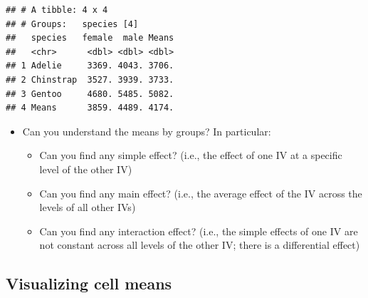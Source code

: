 \documentclass[
]{book}
\newenvironment{Shaded}{\begin{snugshade}}{\end{snugshade}}
\newcommand{\CommentTok}[1]{\textcolor[rgb]{0.56,0.35,0.01}{\textit{#1}}}
\newcommand{\DecValTok}[1]{\textcolor[rgb]{0.00,0.00,0.81}{#1}}
\newcommand{\FunctionTok}[1]{\textcolor[rgb]{0.13,0.29,0.53}{\textbf{#1}}}
\newcommand{\NormalTok}[1]{#1}
\newcommand{\OtherTok}[1]{\textcolor[rgb]{0.56,0.35,0.01}{#1}}
\newcommand{\SpecialCharTok}[1]{\textcolor[rgb]{0.81,0.36,0.00}{\textbf{#1}}}
\newcommand{\StringTok}[1]{\textcolor[rgb]{0.31,0.60,0.02}{#1}}
\begin{document}
\begin{Shaded}
\end{Shaded}

\begin{verbatim}
## # A tibble: 4 x 4
## # Groups:   species [4]
##   species   female  male Means
##   <chr>      <dbl> <dbl> <dbl>
## 1 Adelie     3369. 4043. 3706.
## 2 Chinstrap  3527. 3939. 3733.
## 3 Gentoo     4680. 5485. 5082.
## 4 Means      3859. 4489. 4174.
\end{verbatim}

\begin{itemize}
\item
  Can you understand the means by groups? In particular:

  \begin{itemize}
  \item
    Can you find any simple effect? (i.e., the effect of one IV at a specific level of the other IV)
  \item
    Can you find any main effect? (i.e., the average effect of the IV across the levels of all other IVs)
  \item
    Can you find any interaction effect? (i.e., the simple effects of one IV are not constant across all levels of the other IV; there is a differential effect)
  \end{itemize}
\end{itemize}

\subsection{Visualizing cell means}\label{visualizing-cell-means}
\end{document}

